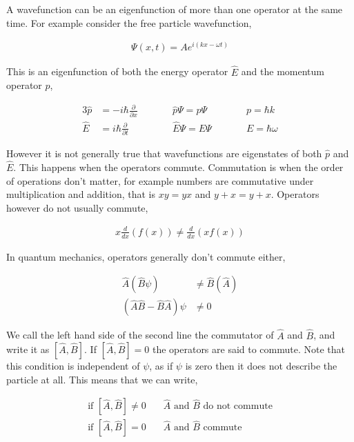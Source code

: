 \documentclass[11pt]{amsart}
\begin{document}
A wavefunction can be an eigenfunction of more than one operator at the same time. For example consider the free particle wavefunction,

\begin{align*}
  \Psi(x, t) = Ae^{i(kx - \omega t)}
\end{align*}

This is an eigenfunction of both the energy operator $\hat{E}$ and the momentum operator $\hat{p}$,

\begin{alignat*}{3}
  \hat{p} &= -i\hbar\frac{\partial}{\partial x} \qquad &&\hat{p}\Psi = p\Psi \qquad &&p=\hbar k\\
  \hat{E} &= i\hbar\frac{\partial}{\partial t} \qquad &&\hat{E}\Psi = E\Psi \qquad &&E=\hbar \omega
\end{alignat*}

However it is not generally true that wavefunctions are eigenstates of both $\hat{p}$ and $\hat{E}$. This happens when the operators commute. Commutation is when the order of operations don't matter, for example numbers are commutative under multiplication and addition, that is $xy = yx$ and $y + x = y + x$. Operators however do not usually commute,

\begin{align*}
  x \frac{d}{dx}\left(f(x)\right) \neq \frac{d}{dx}\left(x f(x)\right)
\end{align*}

In quantum mechanics, operators generally don't commute either,

\begin{align*}
  \hat{A}(\hat{B}\psi) &\neq \hat{B}(\hat{A}) \\
  (\hat{A}\hat{B} - \hat{B}\hat{A})\psi &\neq 0
\end{align*}

We call the left hand side of the second line the commutator of $\hat{A}$ and $\hat{B}$, and write it as $[\hat{A}, \hat{B}]$. If $[\hat{A}, \hat{B}] = 0$ the operators are said to commute. Note that this condition is independent of $\psi$, as if $\psi$ is zero then it does not describe the particle at all. This means that we can write,

\begin{align*}
  \text{if } [\hat{A}, \hat{B}] \neq 0 &\quad \text{$\hat{A}$ and $\hat{B}$ do not commute} \\
  \text{if } [\hat{A}, \hat{B}] = 0 &\quad \text{$\hat{A}$ and $\hat{B}$ commute}
\end{align*}
\end{document}
